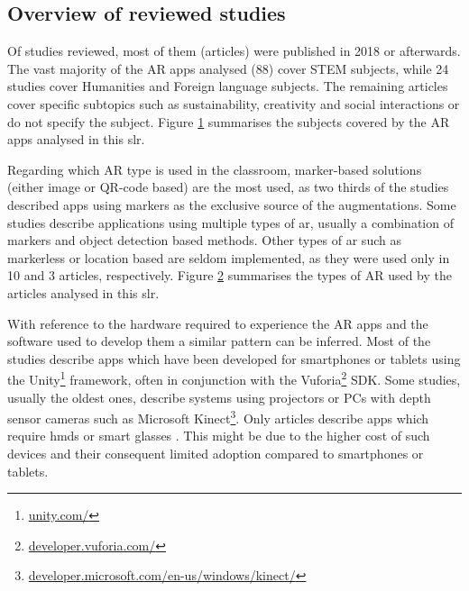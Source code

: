 \subsection{Overview of reviewed studies}

Of \papersSelected studies reviewed, most of them (\papersAfterTwentyEighteen articles) were published in 2018 or afterwards. The vast majority of the AR apps analysed (88) cover STEM subjects, while 24 studies cover Humanities and Foreign language subjects. The remaining articles cover specific subtopics such as sustainability, creativity and social interactions or do not specify the subject. Figure \ref{fig:subjects} summarises the subjects covered by the AR apps analysed in this \gls{slr}.

\begin{figure}[htbp]	
	\begin{center}
	
	\captionsetup{font=small}
	\caption{\fontsize{10pt}{11pt}}
	\label{fig:subjects}
    \end{center}
\end{figure}


Regarding which AR type is used in the classroom, marker-based solutions (either image or QR-code based) are the most used, as two thirds of the studies described apps using markers as the exclusive source of the augmentations. 
Some studies describe applications using multiple types of \gls{ar}, usually a combination of markers and object detection based methods. Other types of \gls{ar} such as markerless or location based are seldom implemented, as they were used only in 10 and 3 articles, respectively. Figure \ref{fig:artech} summarises the types of AR used by the articles analysed in this \gls{slr}.

\begin{figure}[htbp]	
	\begin{center}
	
	\captionsetup{font=small}
	\caption{\fontsize{10pt}{11pt}}
	\label{fig:artech}
    \end{center}
\end{figure}

With reference to the hardware required to experience the AR apps and the software used to develop them a similar pattern can be inferred. Most of the studies describe apps which have been developed for smartphones or tablets using the Unity\footnote{\url{unity.com/}} framework, often in conjunction with the Vuforia\footnote{\url{developer.vuforia.com/}} \gls{SDK}. Some studies, usually the oldest ones, describe systems using projectors or PCs with depth sensor cameras such as Microsoft Kinect\footnote{\url{developer.microsoft.com/en-us/windows/kinect/}}. Only \hardwareHMD articles describe apps which require \glspl{hmd} or smart glasses \citep{ oh2016designing, oh2017hybrid, matsutomo2017computer, khan2018mathland, wei2018improving, kum2019ar, radu2022augmented, resnyansky2022tangible}. This might be due to the higher cost of such devices and their consequent limited adoption compared to smartphones or tablets.

